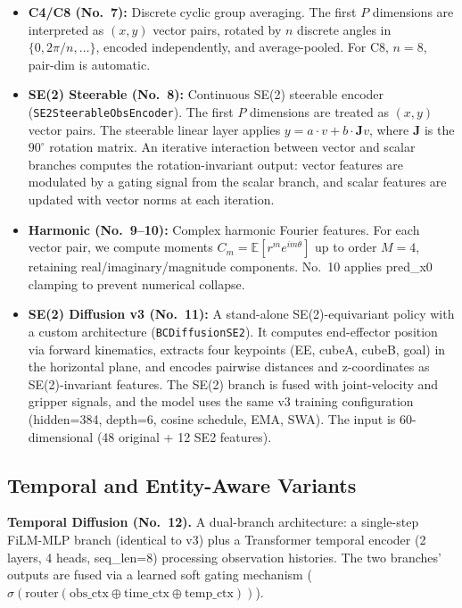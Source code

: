 \documentclass[twocolumn]{article}
\begin{document}
\begin{itemize}
    \item \textbf{C4/C8 (No.~7):} Discrete cyclic group averaging. The first $P$ dimensions are interpreted as $(x,y)$ vector pairs, rotated by $n$ discrete angles in $\{0, 2\pi/n, \ldots\}$, encoded independently, and average-pooled. For C8, $n=8$, pair-dim is automatic.

    \item \textbf{SE(2) Steerable (No.~8):} Continuous SE(2) steerable encoder (\texttt{SE2SteerableObsEncoder}). The first $P$ dimensions are treated as $(x,y)$ vector pairs. The steerable linear layer applies $y = a \cdot v + b \cdot \mathbf{J}v$, where $\mathbf{J}$ is the $90^\circ$ rotation matrix. An iterative interaction between vector and scalar branches computes the rotation-invariant output: vector features are modulated by a gating signal from the scalar branch, and scalar features are updated with vector norms at each iteration.

    \item \textbf{Harmonic (No.~9--10):} Complex harmonic Fourier features. For each vector pair, we compute moments $C_m = \mathbb{E}[r^m e^{i m\theta}]$ up to order $M=4$, retaining real/imaginary/magnitude components. No.~10 applies pred\_x0 clamping to prevent numerical collapse.

    \item \textbf{SE(2) Diffusion v3 (No.~11):} A stand-alone SE(2)-equivariant policy with a custom architecture (\texttt{BCDiffusionSE2}). It computes end-effector position via forward kinematics, extracts four keypoints (EE, cubeA, cubeB, goal) in the horizontal plane, and encodes pairwise distances and z-coordinates as SE(2)-invariant features. The SE(2) branch is fused with joint-velocity and gripper signals, and the model uses the same v3 training configuration (hidden=384, depth=6, cosine schedule, EMA, SWA). The input is 60-dimensional (48 original + 12 SE2 features).
\end{itemize}

\subsection{Temporal and Entity-Aware Variants}
\label{sec:temporal-entity}

\noindent\textbf{Temporal Diffusion (No.~12).} A dual-branch architecture: a single-step FiLM-MLP branch (identical to v3) plus a Transformer temporal encoder (2 layers, 4 heads, seq\_len=8) processing observation histories. The two branches' outputs are fused via a learned soft gating mechanism ($\sigma(\text{router}(\text{obs\_ctx} \oplus \text{time\_ctx} \oplus \text{temp\_ctx}))$).
\end{document}
